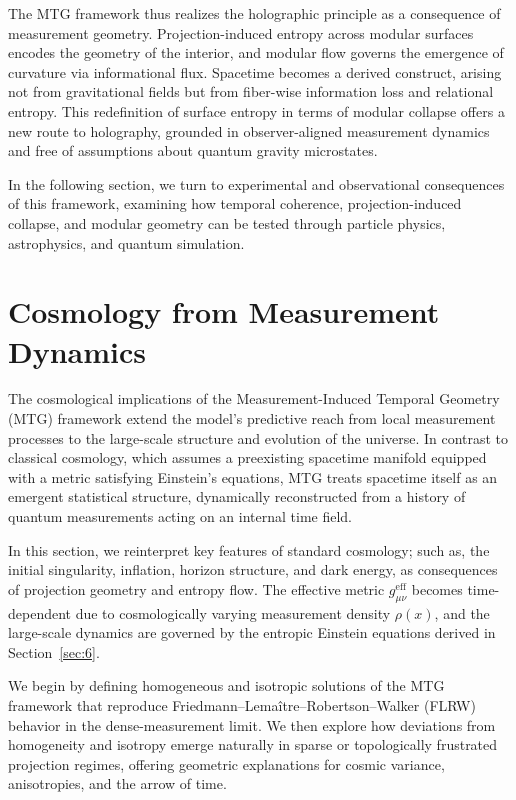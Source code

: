 \documentclass[11pt]{article}
\begin{document}
The MTG framework thus realizes the holographic principle as a consequence of measurement geometry. Projection-induced entropy across modular surfaces encodes the geometry of the interior, and modular flow governs the emergence of curvature via informational flux. Spacetime becomes a derived construct, arising not from gravitational fields but from fiber-wise information loss and relational entropy. This redefinition of surface entropy in terms of modular collapse offers a new route to holography, grounded in observer-aligned measurement dynamics and free of assumptions about quantum gravity microstates.

In the following section, we turn to experimental and observational consequences of this framework, examining how temporal coherence, projection-induced collapse, and modular geometry can be tested through particle physics, astrophysics, and quantum simulation.

\section{Cosmology from Measurement Dynamics}\label{sec:7}
The cosmological implications of the Measurement-Induced Temporal Geometry (MTG) framework extend the model's predictive reach from local measurement processes to the large-scale structure and evolution of the universe. In contrast to classical cosmology, which assumes a preexisting spacetime manifold equipped with a metric satisfying Einstein’s equations, MTG treats spacetime itself as an emergent statistical structure, dynamically reconstructed from a history of quantum measurements acting on an internal time field.

In this section, we reinterpret key features of standard cosmology; such as, the initial singularity, inflation, horizon structure, and dark energy, as consequences of projection geometry and entropy flow. The effective metric \( g^{\mathrm{eff}}_{\mu\nu} \) becomes time-dependent due to cosmologically varying measurement density \( \rho(x) \), and the large-scale dynamics are governed by the entropic Einstein equations derived in Section~\ref{sec:6}.

We begin by defining homogeneous and isotropic solutions of the MTG framework that reproduce Friedmann–Lema\^itre–Robertson–Walker (FLRW) behavior in the dense-measurement limit. We then explore how deviations from homogeneity and isotropy emerge naturally in sparse or topologically frustrated projection regimes, offering geometric explanations for cosmic variance, anisotropies, and the arrow of time.
\end{document}
